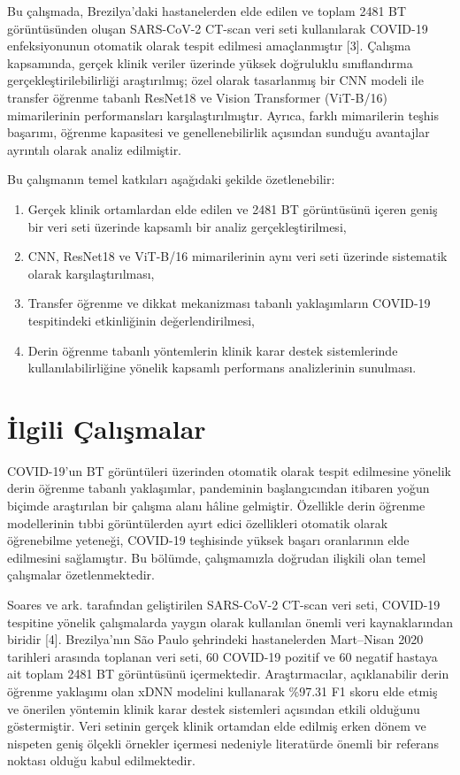 \documentclass[conference]{IEEEtran}
\begin{document}
Bu çalışmada, Brezilya'daki hastanelerden elde edilen ve toplam 2481 BT görüntüsünden oluşan SARS-CoV-2 CT-scan veri seti kullanılarak COVID-19 enfeksiyonunun otomatik olarak tespit edilmesi amaçlanmıştır [3]. Çalışma kapsamında, gerçek klinik veriler üzerinde yüksek doğruluklu sınıflandırma gerçekleştirilebilirliği araştırılmış; özel olarak tasarlanmış bir CNN modeli ile transfer öğrenme tabanlı ResNet18 ve Vision Transformer (ViT-B/16) mimarilerinin performansları karşılaştırılmıştır. Ayrıca, farklı mimarilerin teşhis başarımı, öğrenme kapasitesi ve genellenebilirlik açısından sunduğu avantajlar ayrıntılı olarak analiz edilmiştir.

Bu çalışmanın temel katkıları aşağıdaki şekilde özetlenebilir:

\begin{enumerate}
    \item Gerçek klinik ortamlardan elde edilen ve 2481 BT görüntüsünü içeren geniş bir veri seti üzerinde kapsamlı bir analiz gerçekleştirilmesi,
    \item CNN, ResNet18 ve ViT-B/16 mimarilerinin aynı veri seti üzerinde sistematik olarak karşılaştırılması,
    \item Transfer öğrenme ve dikkat mekanizması tabanlı yaklaşımların COVID-19 tespitindeki etkinliğinin değerlendirilmesi,
    \item Derin öğrenme tabanlı yöntemlerin klinik karar destek sistemlerinde kullanılabilirliğine yönelik kapsamlı performans analizlerinin sunulması.
\end{enumerate}

\section{İlgili Çalışmalar}
COVID-19'un BT görüntüleri üzerinden otomatik olarak tespit edilmesine yönelik derin öğrenme tabanlı yaklaşımlar, pandeminin başlangıcından itibaren yoğun biçimde araştırılan bir çalışma alanı hâline gelmiştir. Özellikle derin öğrenme modellerinin tıbbi görüntülerden ayırt edici özellikleri otomatik olarak öğrenebilme yeteneği, COVID-19 teşhisinde yüksek başarı oranlarının elde edilmesini sağlamıştır. Bu bölümde, çalışmamızla doğrudan ilişkili olan temel çalışmalar özetlenmektedir.

Soares ve ark. tarafından geliştirilen SARS-CoV-2 CT-scan veri seti, COVID-19 tespitine yönelik çalışmalarda yaygın olarak kullanılan önemli veri kaynaklarından biridir [4]. Brezilya'nın São Paulo şehrindeki hastanelerden Mart–Nisan 2020 tarihleri arasında toplanan veri seti, 60 COVID-19 pozitif ve 60 negatif hastaya ait toplam 2481 BT görüntüsünü içermektedir. Araştırmacılar, açıklanabilir derin öğrenme yaklaşımı olan xDNN modelini kullanarak \%97.31 F1 skoru elde etmiş ve önerilen yöntemin klinik karar destek sistemleri açısından etkili olduğunu göstermiştir. Veri setinin gerçek klinik ortamdan elde edilmiş erken dönem ve nispeten geniş ölçekli örnekler içermesi nedeniyle literatürde önemli bir referans noktası olduğu kabul edilmektedir.
\end{document}

